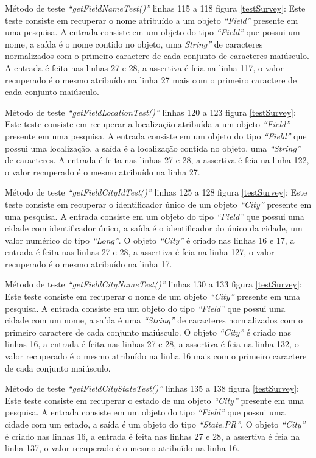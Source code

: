 Método de teste\textit{ “getFieldNameTest()”} linhas 115 a 118 figura \ref{testSurvey}: Este teste consiste em recuperar o nome atribuído a um objeto \textit{“Field”} presente em uma pesquisa. A entrada consiste em um objeto do tipo \textit{“Field”} que possui um nome, a saída é o nome contido no objeto, uma \textit{String”} de caracteres normalizados com o primeiro caractere de cada conjunto de caracteres maiúsculo. A entrada é feita nas linhas 27 e 28, a assertiva é feia na linha 117, o valor recuperado é o mesmo atribuído na linha 27 mais com o primeiro caractere de cada conjunto maiúsculo.

Método de teste \textit{“getFieldLocationTest()”} linhas 120 a 123 figura \ref{testSurvey}: Este teste consiste em recuperar a localização atribuída a um objeto \textit{“Field”} presente em uma pesquisa. A entrada consiste em um objeto do tipo \textit{“Field”} que possui uma localização, a saída é a localização contida no objeto, uma \textit{“String”} de caracteres. A entrada é feita nas linhas 27 e 28, a assertiva é feia na linha 122, o valor recuperado é o mesmo atribuído na linha 27.

Método de teste\textit{ “getFieldCityIdTest()”} linhas 125 a 128 figura \ref{testSurvey}: Este teste consiste em recuperar o identificador único de um objeto \textit{“City”} presente em uma pesquisa. A entrada consiste em um objeto do tipo \textit{“Field”} que possui uma cidade com identificador único, a saída é o identificador do único da cidade, um valor numérico do tipo \textit{“Long”}. O objeto \textit{“City”} é criado nas linhas 16 e 17, a entrada é feita nas linhas 27 e 28, a assertiva é feia na linha 127, o valor recuperado é o mesmo atribuído na linha 17.


Método de teste \textit{“getFieldCityNameTest()”} linhas 130 a 133 figura \ref{testSurvey}: Este teste consiste em recuperar o nome de um objeto \textit{“City”} presente em uma pesquisa. A entrada consiste em um objeto do tipo \textit{“Field”} que possui uma cidade com um nome, a saída é uma \textit{“String”} de caracteres normalizados com o primeiro caractere de cada conjunto maiúsculo. O objeto \textit{“City”} é criado nas linhas 16, a entrada é feita nas linhas 27 e 28, a assertiva é feia na linha 132, o valor recuperado é o mesmo atribuído na linha 16 mais com o primeiro caractere de cada conjunto maiúsculo.

Método de teste \textit{“getFieldCityStateTest()”} linhas 135 a 138 figura \ref{testSurvey}: Este teste consiste em recuperar o estado de um objeto \textit{“City”} presente em uma pesquisa. A entrada consiste em um objeto do tipo \textit{“Field”} que possui uma cidade com um estado, a saída é um objeto do tipo \textit{“State.PR”}. O objeto \textit{“City”} é criado nas linhas 16, a entrada é feita nas linhas 27 e 28, a assertiva é feia na linha 137, o valor recuperado é o mesmo atribuído na linha 16.

